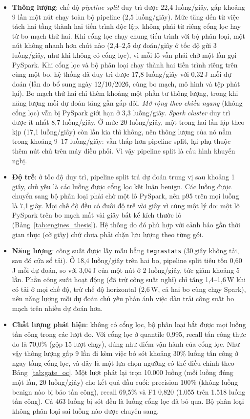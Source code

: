 \begin{itemize}
    \item \textbf{Thông lượng}: chế độ \emph{pipeline split} duy trì được 22{,}4 luồng/giây, gấp khoảng 9 lần một nút chạy toàn bộ pipeline (2{,}5 luồng/giây). Mức tăng đến từ việc tách hai tầng thành hai tiến trình độc lập, không phải từ riêng cổng lọc hay từ bo mạch thứ hai. Khi cổng lọc chạy chung tiến trình với bộ phân loại, một nút không nhanh hơn chút nào (2{,}4--2{,}5 dự đoán/giây ở tốc độ gửi 3 luồng/giây, như khi không có cổng lọc), vì mỗi lô vẫn phải chờ một lần gọi PySpark. Khi cổng lọc và bộ phân loại chạy thành hai tiến trình riêng trên cùng một bo, hệ thống đã duy trì được 17{,}8 luồng/giây với 0{,}32\,J mỗi dự đoán (lần đo bổ sung ngày 12/10/2026, cùng bo mạch, mô hình và tệp phát lại). Bo mạch thứ hai chỉ thêm khoảng một phần tư thông lượng, trong khi năng lượng mỗi dự đoán tăng gần gấp đôi. \emph{Mở rộng theo chiều ngang} (không cổng lọc) vẫn bị PySpark giới hạn ở 3{,}3 luồng/giây. \emph{Spark cluster} duy trì được ít nhất 8{,}7 luồng/giây. Ở mức 20 luồng/giây, một trong hai lần lặp theo kịp (17{,}1 luồng/giây) còn lần kia thì không, nên thông lượng của nó nằm trong khoảng 9--17 luồng/giây: vẫn thấp hơn pipeline split, lại phụ thuộc thêm nút chủ trên máy điều phối. Vì vậy pipeline split là cấu hình khuyến nghị.
    \item \textbf{Độ trễ}: ở tốc độ duy trì, pipeline split trả dự đoán trung vị sau khoảng 1\,giây, chủ yếu là các luồng được cổng lọc kết luận benign. Các luồng được chuyển sang bộ phân loại phải chờ một lô PySpark, nên p95 trên mọi luồng là 7{,}1\,giây. Mọi chế độ đều có đuôi độ trễ vài giây vì cùng một lý do: một lô PySpark trên bo mạch mất vài giây bất kể kích thước lô (Bảng~\ref{tab:engines_thesis}). Hệ thống do đó phù hợp với cảnh báo gần thời gian thực (cỡ giây) chứ chưa phải chặn lưu lượng theo từng gói.
    \item \textbf{Năng lượng}: công suất được lấy mẫu bằng \texttt{tegrastats} (30\,giây không tải, sau đó cửa sổ tải). Ở 18{,}4 luồng/giây trên hai bo, pipeline split tiêu tốn 0{,}60\,J mỗi dự đoán, so với 3{,}04\,J của một nút ở 2 luồng/giây, tức giảm khoảng 5 lần. Phần công suất hoạt động (đã trừ công suất nghỉ) chỉ tăng 1{,}4--1{,}6\,W khi có tải ở mọi chế độ, trừ chế độ horizontal (2{,}6\,W, cả hai bo cùng chạy Spark), nên năng lượng mỗi dự đoán chủ yếu phản ánh việc dàn trải công suất bo mạch trên nhiều dự đoán hơn.
    \item \textbf{Chất lượng phát hiện}: không có cổng lọc, bộ phân loại bắt được mọi luồng tấn công trong các lượt đo. Với cổng lọc ở quantile 0{,}995, recall tấn công thực đo là 70{,}0\% (gộp 15 lượt chạy), đúng như điểm vận hành của cổng lọc. Như vậy thông lượng gấp 9 lần đi kèm việc bỏ sót khoảng 30\% luồng tấn công ở ngay tầng cổng lọc, và đây là một lựa chọn ngưỡng có thể điều chỉnh theo Bảng~\ref{tab:gate_oc}. Một lượt phát lại trọn 10.000 luồng (mỗi luồng đúng một lần, 20 luồng/giây) cho kết quả đầu cuối: precision 100\% (không luồng benign nào bị báo tấn công), recall 69{,}5\% và F1 0{,}820 (1.055 trên 1.518 luồng tấn công). Cả 463 luồng bị sót đều là luồng cổng lọc đã bỏ qua. Bộ phân loại không phân loại sai luồng nào được chuyển sang.
\end{itemize}

